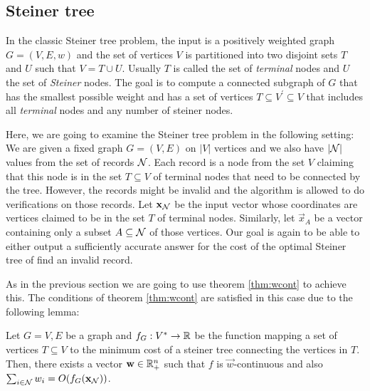 \subsection{Steiner tree} \label{ssec:steinerIOpt}

In the classic Steiner tree problem, the input is a positively weighted graph $G=(V,E,w)$ and the set of vertices $V$ is partitioned into two disjoint sets $T$ and
$U$ such that $V=T\cup U$. Usually $T$ is called the set of \emph{terminal} nodes and $U$ the set of \emph{Steiner} nodes. The goal is to compute a connected
subgraph of $G$ that has the smallest possible weight and has a set of vertices $T\subseteq V^\prime \subseteq V$ that includes all \emph{terminal} nodes and any number of steiner nodes.

  Here, we are going to examine the Steiner tree problem in the following setting: We are given a fixed graph $G=(V,E)$ on $\vert V\vert$ vertices and we also have
$\vert \mathcal{N}\vert$ values from the set of records $\mathcal{N}$. Each record is a node from the set $V$ claiming that this node is in the set $T\subseteq V$ of
terminal nodes that need to be connected by the tree. However, the records might be invalid and the algorithm is allowed to do verifications on those records.
Let $\mathbf{x}_{\mathcal{N}}$ be the input vector whose coordinates are vertices claimed to be in the set $T$ of terminal nodes. Similarly, let $\vec{x}_A$ be a vector
containing only a subset $A\subseteq \mathcal{N}$ of those vertices. Our goal is again to be able to either output a sufficiently accurate answer for the cost of the
optimal Steiner tree of find an invalid record.

As in the previous section we are going to use theorem \ref{thm:wcont} to achieve this. The conditions of theorem \ref{thm:wcont} are satisfied in this case due to
the following lemma:

\begin{lemma}\label{lm:steiner}
    Let $G=V,E$ be a graph and $f_G : V^* \to \mathbb{R}$ be the function mapping a set of vertices $T\subseteq V$ to the minimum cost of a steiner tree connecting the
  vertices in $T$.  Then, there exists a vector $\mathbf{w}\in \mathbb{R}_+^n$ such that $f$ is $\vec{w}$-continuous and also
  $\sum_{i\in \mathcal{N}}w_i = O(f_G(\mathbf{x}_{\mathcal{N}}))$.
\end{lemma}

